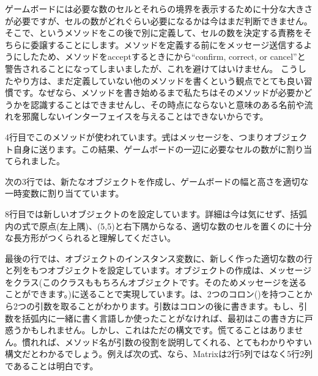 \documentclass[a4paper,10pt,twoside]{book}
\begin{document}
ゲームボードには必要な数のセルとそれらの境界を表示するために十分な大きさが必要ですが、セルの数がどれぐらい必要になるかは今はまだ判断できません。そこで、というメソッドをこの後で別に定義して、セルの数を決定する責務をそちらに委譲することにします。メソッドを定義する前にをメッセージ送信するようにしたため、メソッドをacceptするときに\pharo から``confirm, correct, or cancel''と警告されることになってしまいましたが、これを避けてはいけません。
こうしたやり方は、まだ定義していない他のメソッドを書くという観点でとても良い習慣です。なぜなら、メソッドを書き始めるまで私たちはそのメソッドが必要かどうかを認識することはできませんし、その時点にならないと意味のある名前や流れを邪魔しないインターフェイスを与えることはできないからです。

4行目でこのメソッドが使われています。\st 式はメッセージを、つまりオブジェクト自身に送ります。この結果、ゲームボードの一辺に必要なセルの数がに割り当てられました。

次の3行では、新たなオブジェクトを作成し、ゲームボードの幅と高さを適切な一時変数に割り当てています。

8行目では新しいオブジェクトのを設定しています。詳細は今は気にせず、括弧内の式で原点(\ie 左上隅)、(5,5)と右下隅からなる、適切な数のセルを置くのに十分な長方形がつくられると理解してください。

最後の行では、オブジェクトのインスタンス変数に、新しく作った適切な数の行と列をもつオブジェクトを設定しています。オブジェクトの作成は、メッセージをクラス(このクラスももちろんオブジェクトです。そのためメッセージを送ることができます。)に送ることで実現しています。は、2つのコロン(\ct{:})を持つことから2つの引数を取ることがわかります。引数はコロンの後に書きます。もし、引数を括弧内に一緒に書く言語しか使ったことがなければ、最初はこの書き方に戸惑うかもしれません。しかし、これはただの構文です。慌てることはありません。慣れれば、メソッド名が引数の役割を説明してくれる、とてもわかりやすい構文だとわかるでしょう。例えば次の式、なら、Matrixは2行5列ではなく5行2列であることは明白です。
\end{document}
